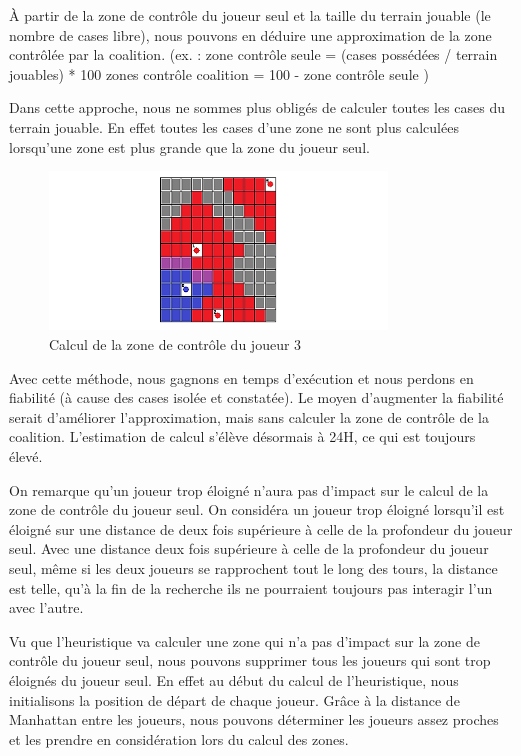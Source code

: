 À partir de la zone de contrôle du joueur seul et la taille du
terrain jouable (le nombre de cases libre), nous pouvons en déduire une
approximation de la zone contrôlée par la coalition.
(ex. : 	
zone contrôle seule = (cases possédées / terrain jouables) * 100
zones contrôle coalition = 100 - zone contrôle seule
)

\begin{info}
	Dans cette approche, nous ne sommes plus obligés de calculer toutes
	les cases du terrain jouable. En effet toutes les cases d'une zone ne sont
	plus calculées lorsqu'une zone est plus grande que la zone du joueur seul.
\end{info}

\begin{figure}[H]
	\centering
	\includegraphics[width=0.8\textwidth]{./pics/heuristique_interruption.png}	
	\caption{Calcul de la zone de contrôle du joueur 3}
\end{figure}

Avec cette méthode, nous gagnons en temps d'exécution et nous
perdons en fiabilité (à cause des cases isolée et constatée). Le moyen
d'augmenter la fiabilité serait d'améliorer l'approximation, mais sans
calculer la zone de contrôle de la coalition. L'estimation de calcul
s'élève désormais à 24H, ce qui est toujours élevé.

On remarque qu'un joueur trop éloigné n'aura pas d'impact sur le 
calcul de la zone de contrôle du joueur seul. On considéra un joueur trop
éloigné lorsqu'il est éloigné sur une distance de deux fois supérieure à 
celle de la profondeur du joueur seul. Avec une distance deux fois supérieure
à celle de la profondeur du joueur seul, même si les deux joueurs se
rapprochent tout le long des tours, la distance est telle, qu'à la fin de la
recherche ils ne pourraient toujours pas interagir l'un avec l'autre.

Vu que l'heuristique va calculer une zone qui n'a pas d'impact sur la
zone de contrôle du joueur seul, nous pouvons supprimer tous les joueurs qui
sont trop éloignés du joueur seul. En effet au début du calcul de
l'heuristique, nous initialisons la position de départ de chaque joueur.
Grâce à la distance de Manhattan entre les joueurs, nous pouvons déterminer
les joueurs assez proches et les prendre en considération lors du calcul des
zones.

